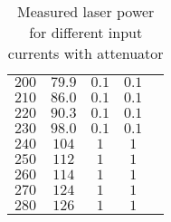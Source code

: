 \documentclass{protokoll_en}
\begin{document}
\begin{appendix}
\begin{table}[H]
{\begin{tabular}{lcccc}
$200$ & $79.9$ & $0.1$ & $0.1$\\
$210$ & $86.0$ & $0.1$ & $0.1$\\
$220$ & $90.3$ & $0.1$ & $0.1$\\
$230$ & $98.0$ & $0.1$ & $0.1$\\
$240$ & $104$ & $1$ & $1$\\
$250$ & $112$ & $1$ & $1$\\
$260$ & $114$ & $1$ & $1$\\
$270$ & $124$ & $1$ & $1$\\
$280$ & $126$ & $1$ & $1$\\
    \bottomrule
  \end{tabular}
}
\caption{Measured laser power for different input currents with attenuator}
  \label{tab:ana_laserpower_att}
\end{table}
\begin{table}[H]
  \centering
{}
\caption{Measured laser power for different input currents without attenuator}
  \label{tab:ana_laserpower_woatt}
\end{table}

\end{appendix}
\end{document}
